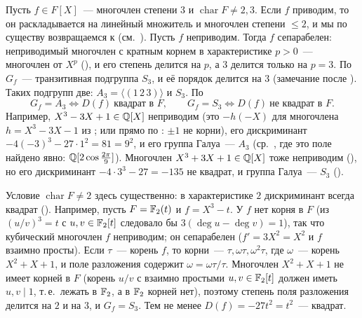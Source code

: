\begin{example}[4.7]
Пусть $f\in F[X]$~--- многочлен степени $3$ и $\operatorname{char}F\ne2,3$. Если $f$ приводим, то он раскладывается на
линейный множитель и многочлен степени $\le2$, и мы по существу возвращаемся к  (см.\ ). Пусть $f$ неприводим.
Тогда $f$ сепарабелен: неприводимый многочлен с кратным корнем в характеристике $p>0$~--- многочлен от $X^p$ (), и его
степень делится на $p$, а $3$ делится только на $p=3$. По  $G_f$~--- транзитивная подгруппа $S_3$, и её порядок
делится на $3$ (замечание после ). Таких подгрупп две: $A_3=\langle(1\,2\,3)\rangle$ и $S_3$. По 
\[
G_f=A_3\iff D(f)\ \text{квадрат в }F,\qquad G_f=S_3\iff D(f)\ \text{не квадрат в }F .
\]
Например, $X^3-3X+1\in\mathbb Q[X]$ неприводим (это $-h(-X)$ для многочлена $h=X^3-3X-1$ из ; или прямо по :
$\pm1$ не корни), его дискриминант $-4(-3)^3-27\cdot1^2=81=9^2$, и его группа Галуа~--- $A_3$
(ср.\ , где это поле найдено явно: $\mathbb Q[2\cos\frac{2\pi}9]$). Многочлен $X^3+3X+1\in\mathbb Q[X]$ тоже неприводим (), но его
дискриминант $-4\cdot3^3-27=-135$ не квадрат, и группа Галуа~--- $S_3$ ().

Условие $\operatorname{char}F\ne2$ здесь существенно: в характеристике $2$ дискриминант всегда квадрат (). Например, пусть
$F=\mathbb F_2(t)$ и $f=X^3-t$. У $f$ нет корня в $F$ (из $(u/v)^3=t$ с $u,v\in\mathbb F_2[t]$ следовало бы $3(\deg u-\deg v)=1$), так что
кубический многочлен $f$ неприводим; он сепарабелен ($f'=3X^2=X^2$ и $f$ взаимно просты). Если $\tau$~--- корень $f$, то корни~---
$\tau,\omega\tau,\omega^2\tau$, где $\omega$~--- корень $X^2+X+1$, и поле разложения содержит $\omega=\omega\tau/\tau$. Многочлен $X^2+X+1$
не имеет корней в $F$ (корень $u/v$ с взаимно простыми $u,v\in\mathbb F_2[t]$ должен иметь $u,v\mid1$, т.\,е.\ лежать в $\mathbb F_2$, а в
$\mathbb F_2$ корней нет), поэтому степень поля разложения делится на $2$ и на $3$, и $G_f=S_3$. Тем не менее $D(f)=-27t^2=t^2$~---
квадрат.
\end{example}

